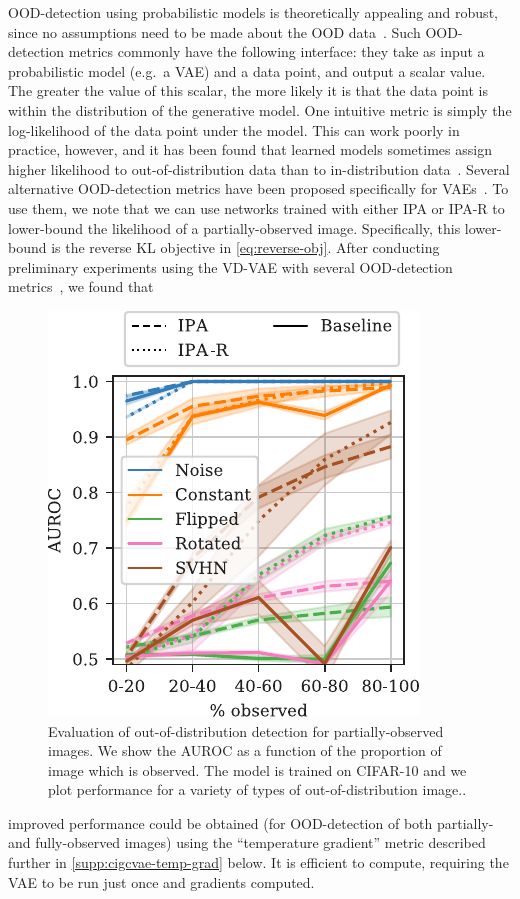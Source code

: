 OOD-detection using probabilistic models is theoretically appealing and robust,
since no assumptions need to be made about the OOD
data~\citep{xiao2020likelihood,havtorn2021hierarchical}. Such OOD-detection
metrics commonly have the following interface: they take as input a
probabilistic model (e.g.~a VAE) and a data point, and output a scalar value.
The greater the value of this scalar, the more likely it is that the data point
is within the distribution of the generative model. One intuitive metric is
simply the log-likelihood of the data point under the model. This can work
poorly in practice, however, and it has been found that learned models sometimes
assign higher likelihood to out-of-distribution data than to in-distribution
data~\citep{nalisnick2018deep}. Several alternative OOD-detection metrics have
been proposed specifically for
VAEs~\citep{xiao2020likelihood,havtorn2021hierarchical}. To use them, we note
that we can use networks trained with either IPA or IPA-R to lower-bound the
likelihood of a partially-observed image. Specifically, this lower-bound is the
reverse KL objective in \cref{eq:reverse-obj}. After conducting preliminary
experiments using the VD-VAE with several OOD-detection
metrics~\citep{xiao2020likelihood,havtorn2021hierarchical}, we found that
\begin{figure}[t]
  \centering
  \includegraphics[scale=1]{figs/cigcvae/ood-supplementary}
  \caption{Evaluation of out-of-distribution detection for partially-observed images. We show the AUROC as a function of the proportion of image which is observed. The model is trained on CIFAR-10 and we plot performance for a variety of types of out-of-distribution image.. }
  \label{fig:cigcvae-ood-supplementary}
\end{figure}
improved performance could be obtained (for OOD-detection of both partially- and
fully-observed images) using the ``temperature gradient'' metric described
further in \cref{supp:cigcvae-temp-grad} below.
%
It is efficient to compute, requiring the VAE to be run just once and gradients
computed.

